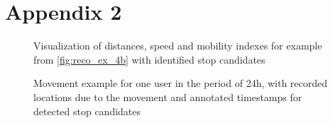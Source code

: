 \chapter{Appendix 2}
\label{appendix:add_example_2}

\begin{figure}[!ht]
	\centering
	\caption{ Visualization of distances, speed and mobility indexes for example from \autoref{fig:reco_ex_4b} with identified stop candidates }
	\label{fig:reco_ex_4a}
\end{figure} 
\begin{figure}[!ht]
	\centering
	\caption{ Movement example for one user in the period of 24h, with recorded locations due to the movement and annotated timestamps for detected stop candidates }
	\label{fig:reco_ex_4b}
\end{figure}